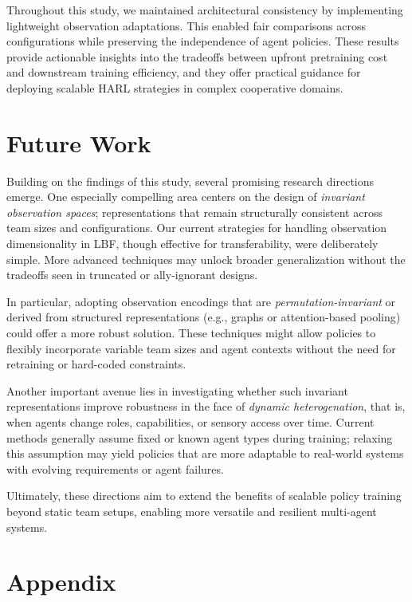 \documentclass{article}
\begin{document}
Throughout this study, we maintained architectural consistency by implementing 
lightweight observation adaptations. This enabled fair comparisons across configurations 
while preserving the independence of agent policies. These results provide actionable 
insights into the tradeoffs between upfront pretraining cost and downstream training efficiency, 
and they offer practical guidance for deploying scalable HARL strategies in complex 
cooperative domains.


\section{Future Work}
Building on the findings of this study, several promising research directions emerge. 
One especially compelling area centers on the design of \emph{invariant observation spaces};
representations that remain structurally consistent across team sizes and configurations. 
Our current strategies for handling observation dimensionality in LBF, 
though effective for transferability, were deliberately simple. More advanced techniques may 
unlock broader generalization without the tradeoffs seen in truncated or ally-ignorant designs.

In particular, adopting observation encodings that are \emph{permutation-invariant} or derived 
from structured representations (e.g., graphs or attention-based pooling) 
could offer a more robust solution. These techniques might allow policies to flexibly 
incorporate variable team sizes and agent contexts without the need for retraining or 
hard-coded constraints.

Another important avenue lies in investigating whether such invariant representations 
improve robustness in the face of \emph{dynamic heterogenation}, that is, 
when agents change roles, capabilities, or sensory access over time. 
Current methods generally assume fixed or known agent types during training; 
relaxing this assumption may yield policies that are more adaptable to real-world 
systems with evolving requirements or agent failures.

Ultimately, these directions aim to extend the benefits of scalable policy training 
beyond static team setups, enabling more versatile and resilient multi-agent systems.

\printbibliography

\clearpage
\appendix

\section*{Appendix}
\end{document}
